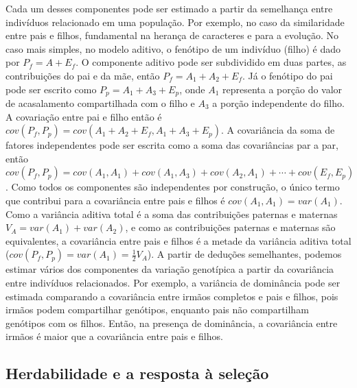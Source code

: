 \begin{refsection}
Cada um desses componentes pode ser estimado a partir da semelhança entre
indivíduos relacionado em uma população. Por exemplo, no caso da similaridade
entre pais e filhos, fundamental na herança de caracteres e para a evolução.
No caso mais simples, no modelo aditivo, o fenótipo de um indivíduo (filho) é dado por
$P_f = A + E_f$. O componente aditivo pode ser subdividido em duas partes, as
contribuições do pai e da mãe, então $P_f = A_1 + A_2 + E_f$. Já o fenótipo do pai
pode ser escrito como $P_p = A_1 + A_3 + E_p$, onde $A_1$ representa a porção
do valor de acasalamento compartilhada com o filho e $A_3$ a porção
independente do filho. A covariação entre pai e filho então é $cov(P_f, P_p) =
cov(A_1 + A_2 + E_f, A_1 + A_3 + E_p)$. A covariância da soma de fatores
independentes pode ser escrita como a soma das covariâncias par a par, então
$cov(P_f, P_p) = cov(A_1, A_1) + cov(A_1, A_3) + cov(A_2, A_1) + \cdots  +
cov(E_f, E_p)$. Como todos os componentes são independentes por construção, o
único termo que contribui para a covariância entre pais e filhos é $cov(A_1,
A_1) = var(A_1)$. Como a variância aditiva total é a soma das contribuições
paternas e maternas $V_A = var(A_1) + var(A_2)$, e como as contribuições
paternas e maternas são equivalentes, a covariância entre pais e filhos é a
metade da variância aditiva total ($cov(P_f, P_p) = var(A_1) = \frac{1}{2}V_A$).
A partir de deduções semelhantes, podemos estimar vários dos componentes da
variação genotípica a partir da covariância entre indivíduos relacionados. Por
exemplo, a variância de dominância pode ser estimada comparando a covariância
entre irmãos completos e pais e filhos, pois irmãos podem compartilhar
genótipos, enquanto pais não compartilham genótipos com os filhos. Então, na
presença de dominância, a covariância entre irmãos é maior que a covariância
entre pais e filhos.

\subsection{Herdabilidade e a resposta à seleção}


\end{refsection}
